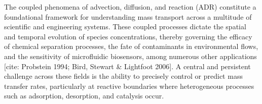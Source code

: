 \documentclass[lineno]{JFM-FLM_Au}
\begin{document}



The coupled phenomena of advection, diffusion, and reaction (ADR) constitute a foundational framework for understanding mass transport across a multitude of scientific and engineering systems. These coupled processes dictate the spatial and temporal evolution of species concentrations, thereby governing the efficacy of chemical separation processes, the fate of contaminants in environmental flows, and the sensitivity of microfluidic biosensors, among numerous other applications [cite: Probstein 1994; Bird, Stewart \& Lightfoot 2006]. A central and persistent challenge across these fields is the ability to precisely control or predict mass transfer rates, particularly at reactive boundaries where heterogeneous processes such as adsorption, desorption, and catalysis occur.
\end{document}
